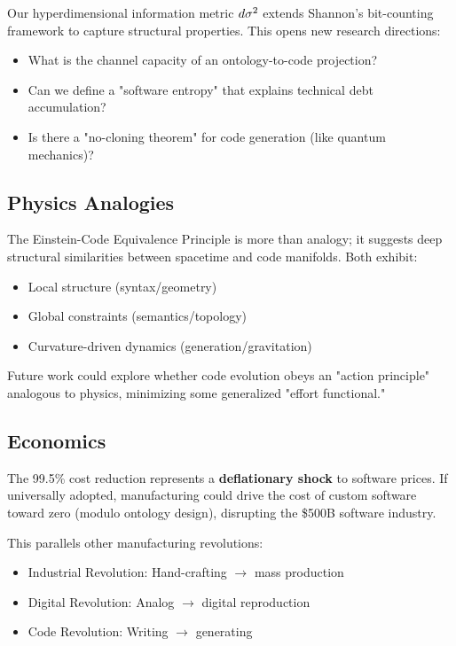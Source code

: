 Our hyperdimensional information metric $d\sigma^2$ extends Shannon's bit-counting framework to capture structural properties. This opens new research directions:

\begin{itemize}
    \item What is the channel capacity of an ontology-to-code projection?
    \item Can we define a "software entropy" that explains technical debt accumulation?
    \item Is there a "no-cloning theorem" for code generation (like quantum mechanics)?
\end{itemize}

\subsection{Physics Analogies}

The Einstein-Code Equivalence Principle is more than analogy; it suggests deep structural similarities between spacetime and code manifolds. Both exhibit:

\begin{itemize}
    \item Local structure (syntax/geometry)
    \item Global constraints (semantics/topology)
    \item Curvature-driven dynamics (generation/gravitation)
\end{itemize}

Future work could explore whether code evolution obeys an "action principle" analogous to physics, minimizing some generalized "effort functional."

\subsection{Economics}

The 99.5\% cost reduction represents a \textbf{deflationary shock} to software prices. If universally adopted, manufacturing could drive the cost of custom software toward zero (modulo ontology design), disrupting the \$500B software industry.

This parallels other manufacturing revolutions:
\begin{itemize}
    \item Industrial Revolution: Hand-crafting $\to$ mass production
    \item Digital Revolution: Analog $\to$ digital reproduction
    \item Code Revolution: Writing $\to$ generating
\end{itemize}

